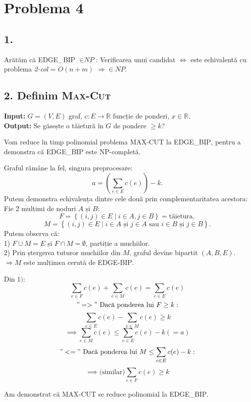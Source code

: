 \documentclass[a4paper,12pt]{article}
\begin{document}
\section*{Problema 4}

\subsection*{1.}

Arătăm că \textsc{EDGE\_BIP} $\in \textit{NP}$: Verificarea unui candidat $\Longleftrightarrow$ este echivalentă cu problema \textit{2-col} = $O(n+m)$ $\Longrightarrow \in \textit{NP}$.

\subsection*{2. Definim \textsc{Max-Cut}}
\textbf{Input:} $G = (V, E)$ graf, $c: E  \to \mathbb{R}$ funcție de ponderi, $x \in \mathbb{R}$. \\
\textbf{Output:} Se găsește o tăietură în $G$ de pondere $\geq k$? 

Vom reduce în timp polinomial problema \textsc{MAX-CUT} la \textsc{EDGE\_BIP}, pentru a demonstra că \textsc{EDGE\_BIP} este \textsc{NP}-completă.

Graful rămâne la fel, singura preprocesare:
\[
a = \left(\sum_{e \in E} c(e)\right) - k.
\]
Putem demonstra echivalența dintre cele două prin complementaritatea acestora: \\
Fie 2 mulțimi de noduri $A$ și $B$:
\[
F = \left\{ (i, j) \in E \mid i \in A, j \in B \right\} = \text{tăietura},
\]
\[
M = \left\{ (i, j) \in E \mid i \in A \text{ și } j \in A \text{ sau } i \in B \text{ și } j \in B \right\}.
\]
Putem observa că: \\
1) $F \cup M = E$ și $F \cap M = \emptyset$, partiție a muchiilor. \\
2) Prin ștergerea tuturor muchiilor din $M$, graful devine bipartit $(A, B, E)$. \\
$\Longrightarrow M$ este mulțimea cerută de \textsc{EDGE-BIP}.

Din $1)$:
\[
\sum_{e \in F} c(e) + \sum_{e \in M} c(e) = \sum_{e \in E} c(e)
\]
\[
\text{$"=>"$ Dacă ponderea lui } F \geq k:
\]
\[
\sum_{e \in E} c(e) - \sum_{e \in M} c(e) \geq k
\]
\[
\implies \sum_{e \in M} c(e) \leq \sum_{e \in E} c(e) - k (= a)
\]
\[
\text{$"<="$ Dacă ponderea lui } M \leq \sum_{e \in E} c(e) - k:
\]
\[
\implies \text{(similar)} \sum_{e \in F} c(e) \geq k
\]

Am demonstrat că \textsc{MAX-CUT} se reduce polinomial la \textsc{EDGE\_BIP}.
\end{document}
